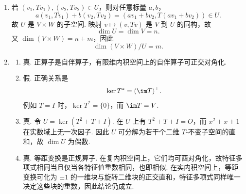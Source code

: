 \begin{enumerate}
    \item 若 $(v_1,Tv_1),(v_2,Tv_2)\in U$，则对任意标量 $a,b$，
    \[
        a(v_1,Tv_1)+b(v_2,Tv_2)=(av_1+bv_2,T(av_1+bv_2))\in U.
    \]
    故 $U$ 是 $V\times W$ 的子空间. 映射 $v\mapsto(v,Tv)$ 是 $V$ 到 $U$ 的同构，故
    \[
        \dim U=\dim V=n.
    \]
    又 $\dim(V\times W)=n+m$，因此
    \[
        \dim (V\times W)/U=m.
    \]

    \item
    \begin{enumerate}
        \item 真. 正算子是自伴算子，有限维内积空间上的自伴算子可正交对角化.

        \item 假. 正确关系是
        \[
            \ker T^*=(\im T)^\perp.
        \]
        例如 $T=I$ 时，$\ker T^*=\{0\}$，而 $\im T=V$.

        \item 真. 令 $U=\ker(T^2+T+I)$. 在 $U$ 上有 $T^2+T+I=O$，而 $x^2+x+1$ 在实数域上无一次因子. 因此 $U$ 可分解为若干个二维 $T$-不变子空间的直和，故 $\dim U$ 为偶数.

        \item 真. 等距变换是正规算子. 在复内积空间上，它们均可酉对角化，故特征多项式相同当且仅当各特征值重数相同，也即相似. 在实内积空间上，等距变换可化为 $\pm1$ 的一维块与旋转二维块的正交直和，特征多项式同样唯一决定这些块的重数，因此结论仍成立.
    \end{enumerate}
\end{enumerate}

\clearpage

